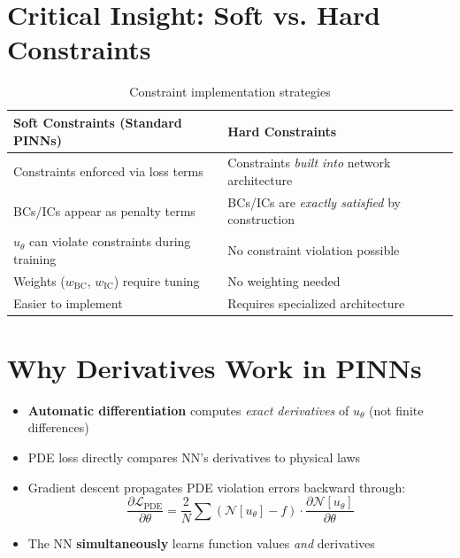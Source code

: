 \documentclass[12pt]{article}
\begin{document}
\section*{Critical Insight: Soft vs. Hard Constraints}
\begin{table}[h]
    \centering
    \begin{tabular}{p{6cm}p{6cm}}
        \toprule
        \textbf{Soft Constraints (Standard PINNs)} & \textbf{Hard Constraints} \\
        \midrule
        Constraints enforced via loss terms & Constraints \textit{built into} network architecture \\
        BCs/ICs appear as penalty terms & BCs/ICs are \textit{exactly satisfied} by construction \\
        $u_{\theta}$ can violate constraints during training & No constraint violation possible \\
        Weights ($w_{\text{BC}}$, $w_{\text{IC}}$) require tuning & No weighting needed \\
        Easier to implement & Requires specialized architecture \\
        \bottomrule
    \end{tabular}
    \caption{Constraint implementation strategies}
\end{table}

\section*{Why Derivatives Work in PINNs}
\begin{itemize}
    \item \textbf{Automatic differentiation} computes \textit{exact derivatives} of $u_{\theta}$ (not finite differences)
    \item PDE loss directly compares NN's derivatives to physical laws
    \item Gradient descent propagates PDE violation errors backward through:
    \begin{equation}
    \frac{\partial \mathcal{L}_{\text{PDE}}}{\partial \theta} = \frac{2}{N} \sum \left(\mathcal{N}[u_{\theta}] - f\right) \cdot \frac{\partial \mathcal{N}[u_{\theta}]}{\partial \theta}
    \end{equation}
    \item The NN \textbf{simultaneously} learns function values \textit{and} derivatives
\end{itemize}
\end{document}

